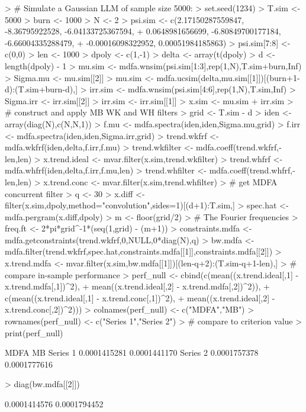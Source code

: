 \documentclass[a4paper]{book}
\begin{document}
\begin{Schunk}
\begin{Sinput}
> # Simulate a Gaussian LLM  of sample size 5000:
> set.seed(1234)
> T.sim <- 5000
> burn <- 1000
> N <- 2
> psi.sim <- c(2.17150287559847, -8.36795922528, -6.04133725367594, 
+              0.0648981656699, -6.80849700177184, -6.66004335288479, 
+              -0.00016098322952, 0.00051984185863)
> psi.sim[7:8] <- c(0,0)
> len <- 1000
> dpoly <- c(1,-1)
> delta <- array(t(dpoly) %
> d <- length(dpoly) - 1
> mu.sim <- mdfa.wnsim(psi.sim[1:3],rep(1,N),T.sim+burn,Inf)
> Sigma.mu <- mu.sim[[2]]
> mu.sim <- mdfa.ucsim(delta,mu.sim[[1]])[(burn+1-d):(T.sim+burn-d),]
> irr.sim <- mdfa.wnsim(psi.sim[4:6],rep(1,N),T.sim,Inf)
> Sigma.irr <- irr.sim[[2]]
> irr.sim <- irr.sim[[1]] 
> x.sim <- mu.sim + irr.sim
> # construct and apply MB WK and WH filters
> grid <- T.sim - d
> iden <- array(diag(N),c(N,N,1))
> f.mu <- mdfa.spectra(iden,iden,Sigma.mu,grid)
> f.irr <- mdfa.spectra(iden,iden,Sigma.irr,grid)
> trend.wkfrf <- mdfa.wkfrf(iden,delta,f.irr,f.mu)
> trend.wkfilter <- mdfa.coeff(trend.wkfrf,-len,len)
> x.trend.ideal <- mvar.filter(x.sim,trend.wkfilter)
> trend.whfrf <- mdfa.whfrf(iden,delta,f.irr,f.mu,len)
> trend.whfilter <- mdfa.coeff(trend.whfrf,-len,len)
> x.trend.conc <- mvar.filter(x.sim,trend.whfilter)
> # get MDFA concurrent filter
> q <- 30
> x.diff <- filter(x.sim,dpoly,method="convolution",sides=1)[(d+1):T.sim,]
> spec.hat <- mdfa.pergram(x.diff,dpoly)
> m <- floor(grid/2)
> # The Fourier frequencies
> freq.ft <- 2*pi*grid^{-1}*(seq(1,grid) - (m+1))
> constraints.mdfa <- mdfa.getconstraints(trend.wkfrf,0,NULL,0*diag(N),q)
> bw.mdfa <- mdfa.filter(trend.wkfrf,spec.hat,constraints.mdfa[[1]],constraints.mdfa[[2]])
> x.trend.mdfa <- mvar.filter(x.sim,bw.mdfa[[1]])[(len-q+2):(T.sim-q+1-len),]
> # compare in-sample performance
> perf_null <- cbind(c(mean((x.trend.ideal[,1] - x.trend.mdfa[,1])^2),
+ 	mean((x.trend.ideal[,2] - x.trend.mdfa[,2])^2)),
+   c(mean((x.trend.ideal[,1] - x.trend.conc[,1])^2),
+ 	mean((x.trend.ideal[,2] - x.trend.conc[,2])^2)))
> colnames(perf_null) <- c("MDFA","MB")
> rownames(perf_null) <- c("Series 1","Series 2")
> # compare to criterion value
> print(perf_null)
\end{Sinput}
\begin{Soutput}
                 MDFA           MB
Series 1 0.0001415281 0.0001441170
Series 2 0.0001757378 0.0001777616
\end{Soutput}
\begin{Sinput}
> diag(bw.mdfa[[2]])
\end{Sinput}
\begin{Soutput}
[1] 0.0001414576 0.0001794452
\end{Soutput}
\end{Schunk}
\end{document}
